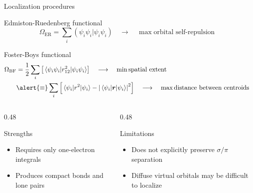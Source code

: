 \documentclass[aspectratio=169,9pt]{beamer}
\newcommand{\cmark}{\textbf{\green{\ding{51}}}}
\newcommand{\xmark}{\textbf{\red{\ding{55}}}}
\newcommand{\br}{\boldsymbol{r}}
\newcommand{\red}[1]{\textcolor{hfRed}{#1}}
\newcommand{\green}[1]{\textcolor{hfGreen}{#1}}
\newcommand{\rbraket}[2]{( #1 | #2 )}
\begin{document}
\begin{frame}{Localization procedures}
	\begin{block}{Edmiston-Ruedenberg functional}
    	\begin{equation*}
    		\boxed{
    			\Omega_\text{ER}
    			=
    			\sum_i \rbraket{\psi_i \psi_i}{\psi_i \psi_i}
    			\quad\longrightarrow\quad\max \text{orbital self-repulsion}
    		}
    	\end{equation*}
	\end{block}	
	\begin{block}{Foster-Boys functional}
    	\begin{equation*}
    	\begin{split}
    			\Omega_\text{BF}
    			& =
    			\frac{1}{2} \sum_i
    			\qty[
    				\mel{\psi_i \psi_i}{r_{12}^2}{\psi_i \psi_i}
    			]
    			\quad\longrightarrow\quad\min \text{spatial extent}
    			\\
    			& \alert{\equiv}
    			\sum_i
    			\qty[
    				\mel{\psi_i}{r^2}{\psi_i}
    				-
    				\abs{\mel{\psi_i}{\br}{\psi_i}}^2
    			]
    			\quad\longrightarrow\quad\max \text{distance between centroids}
    	\end{split}
    	\end{equation*}
	\end{block}

	\begin{columns}[T,onlytextwidth]
		\begin{column}{0.48\textwidth}
			\begin{block}{Strengths}
				\begin{itemize}
					\item[\cmark] Requires only one-electron integrals
					\item[\cmark] Produces compact bonds and lone pairs
				\end{itemize}
			\end{block}
		\end{column}
		\begin{column}{0.48\textwidth}
			\begin{block}{Limitations}
				\begin{itemize}
					\item[\xmark] Does not explicitly preserve $\sigma/\pi$ separation
					\item[\xmark] Diffuse virtual orbitals may be difficult to localize
				\end{itemize}
			\end{block}
		\end{column}
	\end{columns}
\end{frame}
\end{document}

